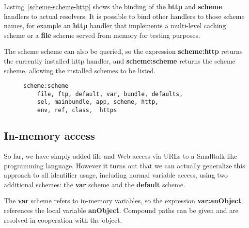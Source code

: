 \documentclass[preprint,authoryear]{acm_proc_article-sp}
\begin{document}
Listing~\ref{scheme-scheme-http} shows the binding of the {\bf http} and {\bf scheme}
handlers to actual resolvers.  It is possible to bind other handlers to those scheme
names, for example an {\bf http} handler that implements a multi-level caching scheme
or a {\bf file} scheme served from memory for testing purposes.


The scheme scheme can also be queried,
so the expression {\bf scheme:http} returns the currently installed http handler, and 
{\bf scheme:scheme} returns the scheme scheme, allowing the installed schemes to
be listed.


\begin{figure}[htbp]
\begin{lstlisting}[style=L,label=scheme-scheme,caption=List of schemes via scheme:scheme.]
  scheme:scheme
    file, ftp, default, var, bundle, defaults, 
    sel, mainbundle, app, scheme, http,
    env, ref, class,  https
\end{lstlisting}
\end{figure}

\subsection{In-memory access}


So far, we have simply added file and Web-access via URLs to a 
Smalltalk-like programming language.  However it turns out that we can actually generalize
this approach to all identifier usage, including normal variable access, using
two additional schemes:  the {\bf var} scheme and the {\bf default} scheme.

The {\bf var} scheme refers to in-memory variables, so the expression
 {\bf var:anObject} references the
local variable {\bf anObject}.   Compound paths can be given and are resolved in
cooperation with the object.
\end{document}
